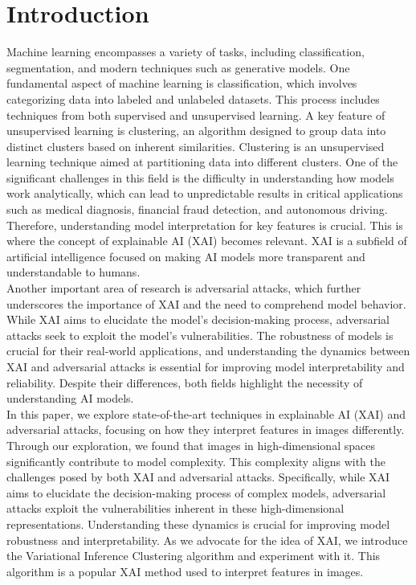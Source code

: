 \documentclass[12pt]{article}
\begin{document}
\section{Introduction}

Machine learning encompasses a variety of tasks, including classification, segmentation, and modern techniques such as generative models. 
One fundamental aspect of machine learning is classification, which involves categorizing data into labeled and unlabeled datasets. 
This process includes techniques from both supervised and unsupervised learning. 
A key feature of unsupervised learning is clustering, an algorithm designed to group data into distinct clusters based on inherent similarities.
Clustering is an unsupervised learning technique aimed at partitioning data into different clusters. 
One of the significant challenges in this field is the difficulty in understanding how models work analytically, which can lead to unpredictable results in critical applications such as medical diagnosis, financial fraud detection, and autonomous driving. 
Therefore, understanding model interpretation for key features is crucial. This is where the concept of explainable AI (XAI) becomes relevant. 
XAI is a subfield of artificial intelligence focused on making AI models more transparent and understandable to humans. \\

Another important area of research is adversarial attacks, which further underscores the importance of XAI and the need to comprehend model behavior. 
While XAI aims to elucidate the model's decision-making process, adversarial attacks seek to exploit the model's vulnerabilities.\cite{athalyeSynthesizingRobustAdversarial2018} \cite{moosavi-dezfooliUniversalAdversarialPerturbations2017}
The robustness of models is crucial for their real-world applications, and understanding the dynamics between XAI and adversarial attacks is essential for improving model interpretability and reliability. 
Despite their differences, both fields highlight the necessity of understanding AI models.\\

In this paper, we explore state-of-the-art techniques in explainable AI (XAI) and adversarial attacks, focusing on how they interpret features in images differently. 
Through our exploration, we found that images in high-dimensional spaces significantly contribute to model complexity. This complexity aligns with the challenges posed by both XAI and adversarial attacks. Specifically, while XAI aims to elucidate the decision-making process of complex models, adversarial attacks exploit the vulnerabilities inherent in these high-dimensional representations. Understanding these dynamics is crucial for improving model robustness and interpretability.
As we advocate for the idea of XAI, we introduce the Variational Inference Clustering algorithm and experiment with it. 
This algorithm is a popular XAI method used to interpret features in images.
\end{document}
